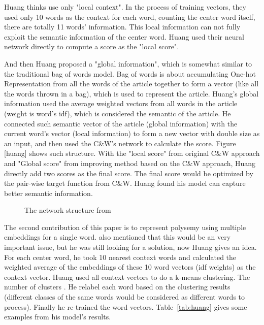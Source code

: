 Huang thinks \cite{CollobertWeston2008} use only "local context". In the process of training vectors, they used only 10 words as the context for each word, counting the center word itself, there are totally 11 words' information. 
This local information can not fully exploit the semantic information of the center word. Huang used their neural network directly to compute a score as the "local score". 

And then Huang proposed a "global information", which is somewhat similar to the traditional bag of words model. Bag of words is about accumulating One-hot Representation from all the words of the article together to form a vector (like all the words thrown in a bag), which is used to represent the article. Huang's global information used the average weighted vectors from all words in the article (weight is word's idf), which is considered the semantic of the article. 
He connected such semantic vector of the article (global information) 
with the current word's vector (local information) to form a new vector with double size as an input, and then used the C$\&$W's network to calculate the score. Figure [huang] shows such structure.
With the "local score" from original C$\&$W approach and "Global score" from improving method based on the C$\&$W approach, Huang directly add two scores as the final score. The final score would be optimized by the pair-wise target function from C$\&$W. Huang found his model can capture better semantic information. \\

\begin{figure}[!ht]
  \centering
	\caption{The network structure from \citep{huang2012improving}}
	\label{fig:huang}
\end{figure}


The second contribution of this paper is to represent polysemy using multiple embeddings for a single word. \citep{bengio2003neural} also mentioned that this would be an very important issue, but he was still looking for a solution, now Huang gives an idea. For each center word, he took 10 nearest context words and calculated the weighted average of the embeddings of these 10 word vectors (idf weights) as the context vector. Huang used all context vectors to do a k-means clustering. The number of clusters . He relabel  each word  based on the clustering results (different classes of the same words would be considered as different words to process). Finally he re-trained the word vectors. Table~\ref{tab:huang} gives some examples from his model's results.\\

